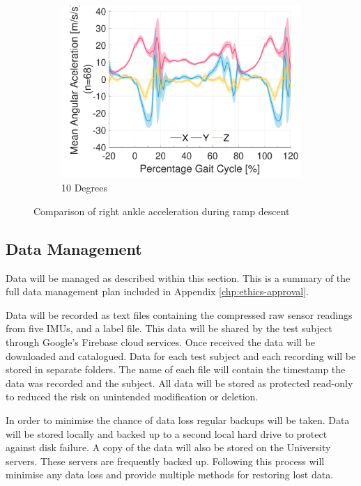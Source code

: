 \begin{figure}[!p]
\begin{subfigure}[b]{0.3\textwidth}
        \includegraphics[width=\textwidth]{content/3-Methods/ramp/ch3_ramp_10_degree_activity_ramp_up_accel_r_ankle.pdf}
        \caption{10 Degrees}
    \end{subfigure}
    \caption{Comparison of right ankle acceleration during ramp descent}
    \label{fig:ramp_down_accel_comparison}
\end{figure}

\subsection{Data Management}
Data will be managed as described within this section. This is a summary of the full data management plan included in Appendix \ref{chp:ethics-approval}.

Data will be recorded as text files containing the compressed raw sensor readings from five IMUs, and a label file. This data will be shared by the test subject through Google's Firebase cloud services. Once received the data will be downloaded and catalogued. Data for each test subject and each recording will be stored in separate folders. The name of each file will contain the timestamp the data was recorded and the subject. All data will be stored as protected read-only to reduced the risk on unintended modification or deletion.

In order to minimise the chance of data loss regular backups will be taken. Data will be stored locally and backed up to a second local hard drive to protect against disk failure. A copy of the data will also be stored on the University servers. These servers are frequently backed up. Following this process will minimise any data loss and provide multiple methods for restoring lost data.

